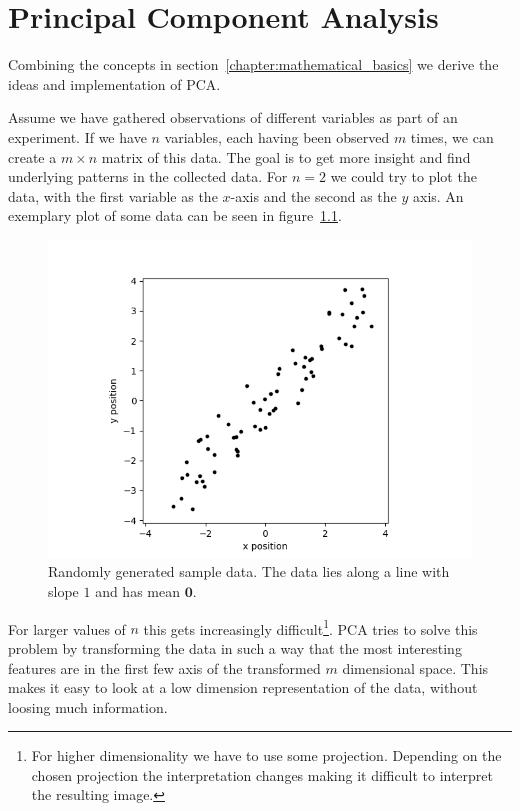 \chapter{Principal Component Analysis}
\label{chapter:principal_component_analysis}

Combining the concepts in section~\ref{chapter:mathematical_basics} we derive the ideas and implementation of PCA.

Assume we have gathered observations of different variables as part of an experiment. If we have $n$ variables, each having been observed $m$ times, we can create a $m \times n$ matrix of this data. The goal is to get more insight and find underlying patterns in the collected data. For $n = 2$ we could try to plot the data, with the first variable as the $x$-axis and the second as the $y$ axis. An exemplary plot of some data can be seen in figure~\ref{fig:some_nice_data}.

\begin{figure}
	\centering
	\includegraphics[width=0.8\linewidth]{figs/some_nice_data_org}
	\caption{Randomly generated sample data. The data lies along a line with slope $1$ and has mean $\mathbf{0}$.}
	\label{fig:some_nice_data}
\end{figure}

For larger values of $n$ this gets increasingly difficult\footnote{For higher dimensionality we have to use some projection. Depending on the chosen projection the interpretation changes making it difficult to interpret the resulting image.}. PCA tries to solve this problem by transforming the data in such a way that the most interesting features are in the first few axis of the transformed $m$ dimensional space. This makes it easy to look at a low dimension representation of the data, without loosing much information.

